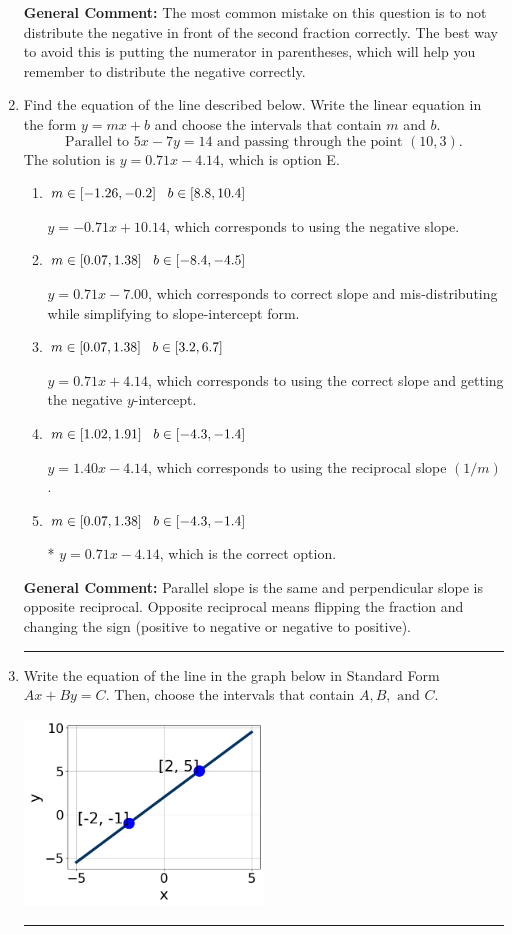 \documentclass{extbook}[14pt]
\newcommand{\litem}[1]{\item #1

\rule{\textwidth}{0.4pt}}
\begin{document}
\begin{enumerate}
{\textbf{General Comment:} The most common mistake on this question is to not distribute the negative in front of the second fraction correctly. The best way to avoid this is putting the numerator in parentheses, which will help you remember to distribute the negative correctly.
}
\litem{
Find the equation of the line described below. Write the linear equation in the form $ y=mx+b $ and choose the intervals that contain $m$ and $b$.
\[ \text{Parallel to } 5 x - 7 y = 14 \text{ and passing through the point } (10, 3). \]The solution is \( y = 0.71x - 4.14 \), which is option E.\begin{enumerate}[label=\Alph*.]
\item \( m \in [-1.26, -0.2] \hspace*{3mm} b \in [8.8, 10.4] \)

 $y = -0.71x + 10.14$, which corresponds to using the negative slope.
\item \( m \in [0.07, 1.38] \hspace*{3mm} b \in [-8.4, -4.5] \)

 $y = 0.71x - 7.00$, which corresponds to correct slope and mis-distributing while simplifying to slope-intercept form.
\item \( m \in [0.07, 1.38] \hspace*{3mm} b \in [3.2, 6.7] \)

 $y = 0.71x + 4.14$, which corresponds to using the correct slope and getting the negative $y$-intercept.
\item \( m \in [1.02, 1.91] \hspace*{3mm} b \in [-4.3, -1.4] \)

 $y = 1.40x - 4.14$, which corresponds to using the reciprocal slope $(1/m)$.
\item \( m \in [0.07, 1.38] \hspace*{3mm} b \in [-4.3, -1.4] \)

* $y = 0.71x - 4.14$, which is the correct option.
\end{enumerate}

\textbf{General Comment:} Parallel slope is the same and perpendicular slope is opposite reciprocal. Opposite reciprocal means flipping the fraction and changing the sign (positive to negative or negative to positive).
}
\litem{
Write the equation of the line in the graph below in Standard Form $Ax+By=C$. Then, choose the intervals that contain $A, B, \text{ and } C$.

\begin{center}
    \includegraphics[width=0.5\textwidth]{../Figures/linearGraphToStandardCopyC.png}
\end{center}


}
\end{enumerate}
\end{document}
